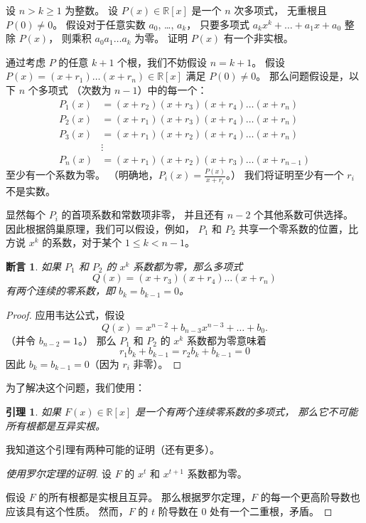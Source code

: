 \documentclass[11pt]{article}
\theoremstyle{claimstyle}
\newtheorem{claim}{断言}
\newtheorem{lemma}{引理}
\theoremstyle{remarkstyle}
\begin{document}
\begin{problembox}
设 $n > k \ge 1$ 为整数。
设 $P(x) \in \mathbb{R}[x]$ 是一个 $n$ 次多项式，
无重根且 $P(0) \neq 0$。
假设对于任意实数 $a_0$, \dots, $a_k$，
只要多项式 $a_k x^k + \dots + a_1 x + a_0$ 整除 $P(x)$，
则乘积 $a_0 a_1 \dots a_k$ 为零。
证明 $P(x)$ 有一个非实根。
\end{problembox}

通过考虑 $P$ 的任意 $k+1$ 个根，我们不妨假设 $n = k+1$。
假设 $P(x) = (x+r_1) \dots (x+r_n) \in \mathbb{R}[x]$ 满足 $P(0) \neq 0$。
那么问题假设是，以下 $n$ 个多项式
（次数为 $n-1$）中的每一个：
\begin{align*}
  P_1(x) &= (x+r_2)(x+r_3)(x+r_4) \dots (x+r_n) \\
  P_2(x) &= (x+r_1)(x+r_3)(x+r_4) \dots (x+r_n) \\
  P_3(x) &= (x+r_1)(x+r_2)(x+r_4) \dots (x+r_n) \\
  &\vdots \\
  P_n(x) &= (x+r_1)(x+r_2)(x+r_3) \dots (x+r_{n-1})
\end{align*}
至少有一个系数为零。
（明确地，$P_i(x) = \frac{P(x)}{x+r_i}$。）
我们将证明至少有一个 $r_i$ 不是实数。

显然每个 $P_i$ 的首项系数和常数项非零，
并且还有 $n-2$ 个其他系数可供选择。
因此根据鸽巢原理，我们可以假设，例如，
$P_1$ 和 $P_2$ 共享一个零系数的位置，比方说
$x^k$ 的系数，对于某个 $1 \le k < n-1$。

\begin{claim}
  如果 $P_1$ 和 $P_2$ 的 $x^k$ 系数都为零，那么多项式
  \[ Q(x) = (x+r_3)(x+r_4) \dots (x+r_n) \]
  有两个连续的零系数，即 $b_k = b_{k-1} = 0$。
\end{claim}

\begin{proof}
  应用韦达公式，假设
  \[ Q(x) = x^{n-2} + b_{n-3} x^{n-3} + \dots + b_0. \]
  （并令 $b_{n-2} = 1$。）
  那么 $P_1$ 和 $P_2$ 的 $x^k$ 系数都为零意味着
  \[ r_1 b_k + b_{k-1} = r_2 b_k + b_{k-1} = 0 \]
  因此 $b_k = b_{k-1} = 0$（因为 $r_i$ 非零）。
\end{proof}

为了解决这个问题，我们使用：

\begin{lemma}
  如果 $F(x) \in \mathbb{R}[x]$ 是一个有两个连续零系数的多项式，
  那么它不可能所有根都是互异实根。
\end{lemma}

我知道这个引理有两种可能的证明（还有更多）。

\begin{proof}[使用罗尔定理的证明]
  设 $F$ 的 $x^t$ 和 $x^{t+1}$ 系数都为零。

  假设 $F$ 的所有根都是实根且互异。
  那么根据罗尔定理，$F$ 的每一个更高阶导数也应该具有这个性质。
  然而，$F$ 的 $t$ 阶导数在 $0$ 处有一个二重根，矛盾。
\end{proof}
\end{document}
